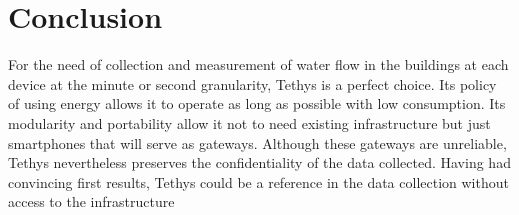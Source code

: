 \documentclass[10pt,journal,compsoc]{IEEEtran}
\begin{document}
\section{Conclusion}\label{sec:conclusion}
For the need of collection and measurement of water flow in the buildings at each device at the minute or second granularity, Tethys is a perfect choice. Its policy of using energy allows it to operate as long as possible with low consumption. Its modularity and portability allow it not to need existing infrastructure but just smartphones that will serve as gateways. Although these gateways are unreliable, Tethys nevertheless preserves the confidentiality of the data collected. 
Having had convincing first results, Tethys could be a reference in the data collection without access to the infrastructure
\appendices
\newline


\end{document}
